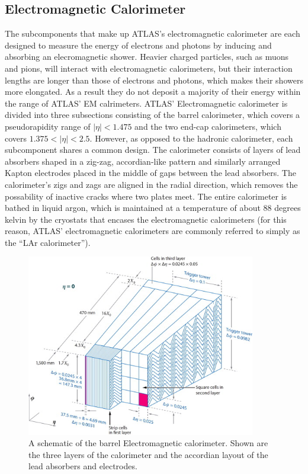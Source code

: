 \subsection{Electromagnetic Calorimeter}
The subcomponents that make up ATLAS's electromagnetic calorimeter are each designed to measure the energy of electrons and photons by inducing and absorbing an elecromagnetic shower.
Heavier charged particles, such as muons and pions, will interact with electromagnetic calorimeters, but their interaction lengths are longer than those of electrons and photons, which makes their showers more elongated.
As a result they do not deposit a majority of their energy within the range of ATLAS' EM calrimeters.
ATLAS' Electromagnetic calorimeter is divided into three subsections consisting of the barrel calorimeter, which covers a pseudorapidity range of $|\eta| < 1.475$ and the two end-cap calorimeters, which covers $1.375 < |\eta| < 2.5$.
However, as opposed to the hadronic calorimeter, each subcomponent shares a common design.
The calorimeter consists of layers of lead absorbers shaped in a zig-zag, accordian-like pattern and similarly arranged Kapton electrodes placed in the middle of gaps between the lead absorbers.
The calorimeter's zigs and zags are aligned in the radial direction, which removes the possability of inactive cracks where two plates meet.
The entire calorimeter is bathed in liquid argon, which is maintained at a temperature of about 88 degrees kelvin by the cryostats that encases the electromagnetic calorimeters (for this reason, ATLAS' electromagnetic calorimeters are commonly referred to simply as the ``LAr calorimeter'').


\begin{figure}
\begin{center}
\includegraphics[width=100mm]{figures/atlas/ElectromagneticCalorimeter.jpg}
\end{center}
  \caption{A schematic of the barrel Electromagnetic calorimeter.  Shown are the three layers of the calorimeter and the accordian layout of the lead absorbers and electrodes.}
  \label{img:AtlasDetectorOverview}
\end{figure}


